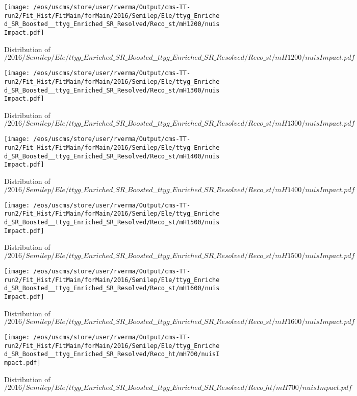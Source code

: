 \begin{figure}
\centering
\texttt{[image: /eos/uscms/store/user/rverma/Output/cms-TT-run2/Fit\_Hist/FitMain/forMain/2016/Semilep/Ele/ttyg\_Enriched\_SR\_Boosted\_\_ttyg\_Enriched\_SR\_Resolved/Reco\_st/mH1200/nuisImpact.pdf]}
\caption{Distribution of $/2016/Semilep/Ele/ttyg\_Enriched\_SR\_Boosted\_\_ttyg\_Enriched\_SR\_Resolved/Reco\_st/mH1200/nuisImpact.pdf$}
\end{figure}

\begin{figure}
\centering
\texttt{[image: /eos/uscms/store/user/rverma/Output/cms-TT-run2/Fit\_Hist/FitMain/forMain/2016/Semilep/Ele/ttyg\_Enriched\_SR\_Boosted\_\_ttyg\_Enriched\_SR\_Resolved/Reco\_st/mH1300/nuisImpact.pdf]}
\caption{Distribution of $/2016/Semilep/Ele/ttyg\_Enriched\_SR\_Boosted\_\_ttyg\_Enriched\_SR\_Resolved/Reco\_st/mH1300/nuisImpact.pdf$}
\end{figure}

\begin{figure}
\centering
\texttt{[image: /eos/uscms/store/user/rverma/Output/cms-TT-run2/Fit\_Hist/FitMain/forMain/2016/Semilep/Ele/ttyg\_Enriched\_SR\_Boosted\_\_ttyg\_Enriched\_SR\_Resolved/Reco\_st/mH1400/nuisImpact.pdf]}
\caption{Distribution of $/2016/Semilep/Ele/ttyg\_Enriched\_SR\_Boosted\_\_ttyg\_Enriched\_SR\_Resolved/Reco\_st/mH1400/nuisImpact.pdf$}
\end{figure}

\begin{figure}
\centering
\texttt{[image: /eos/uscms/store/user/rverma/Output/cms-TT-run2/Fit\_Hist/FitMain/forMain/2016/Semilep/Ele/ttyg\_Enriched\_SR\_Boosted\_\_ttyg\_Enriched\_SR\_Resolved/Reco\_st/mH1500/nuisImpact.pdf]}
\caption{Distribution of $/2016/Semilep/Ele/ttyg\_Enriched\_SR\_Boosted\_\_ttyg\_Enriched\_SR\_Resolved/Reco\_st/mH1500/nuisImpact.pdf$}
\end{figure}

\begin{figure}
\centering
\texttt{[image: /eos/uscms/store/user/rverma/Output/cms-TT-run2/Fit\_Hist/FitMain/forMain/2016/Semilep/Ele/ttyg\_Enriched\_SR\_Boosted\_\_ttyg\_Enriched\_SR\_Resolved/Reco\_st/mH1600/nuisImpact.pdf]}
\caption{Distribution of $/2016/Semilep/Ele/ttyg\_Enriched\_SR\_Boosted\_\_ttyg\_Enriched\_SR\_Resolved/Reco\_st/mH1600/nuisImpact.pdf$}
\end{figure}

\begin{figure}
\centering
\texttt{[image: /eos/uscms/store/user/rverma/Output/cms-TT-run2/Fit\_Hist/FitMain/forMain/2016/Semilep/Ele/ttyg\_Enriched\_SR\_Boosted\_\_ttyg\_Enriched\_SR\_Resolved/Reco\_ht/mH700/nuisImpact.pdf]}
\caption{Distribution of $/2016/Semilep/Ele/ttyg\_Enriched\_SR\_Boosted\_\_ttyg\_Enriched\_SR\_Resolved/Reco\_ht/mH700/nuisImpact.pdf$}
\end{figure}


